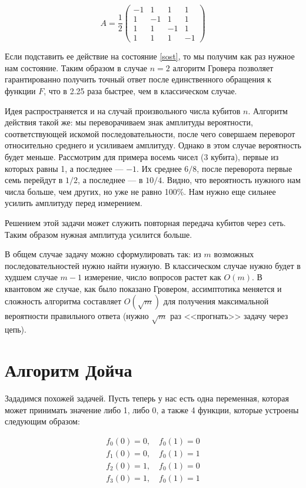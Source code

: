 \documentclass[a4paper, 12pt]{article}
\begin{document}
\begin{equation}
	A = \frac{1}{2}
	\begin{pmatrix}
		-1 & 1 & 1 & 1\\
		1 & -1 & 1 & 1\\
		1 & 1 & -1 & 1\\
		1 & 1 & 1 & -1
	\end{pmatrix}
\end{equation}

Если подставить ее действие на состояние \ref{sost}, то мы получим как раз нужное нам состояние. Таким образом в случае $n=2$ алгоритм Гровера позволяет гарантированно получить точный ответ после единственного обращения к функции $F$, что в 2.25 раза быстрее, чем в классическом случае.

Идея распространяется и на случай произвольного числа кубитов $n$. Алгоритм действия такой же: мы переворачиваем знак амплитуды вероятности, соответствующей искомой последовательности, после чего совершаем переворот относительно среднего и усиливаем амплитуду. Однако в этом случае вероятность будет меньше. Рассмотрим для примера восемь чисел (3 кубита), первые из которых равны 1, а последнее --- $-1$. Их среднее $6/8$, после переворота первые семь перейдут в $1/2$, а последнее --- в $10/4$. Видно, что вероятность нужного нам числа больше, чем других, но уже не равно 100\%. Нам нужно еще сильнее усилить амплитуду перед измерением.


Решением этой задачи может служить повторная передача кубитов через сеть. Таким образом нужная амплитуда усилится больше.

В общем случае задачу можно сформулировать так: из $m$ возможных последовательностей нужно найти нужную. В классическом случае нужно будет в худшем случае $m-1$ измерение, число вопросов растет как $O(m)$. В квантовом же случае, как было показано Гровером, ассимптотика меняется и сложность алгоритма составляет $O(\sqrt{m})$ для получения максимальной вероятности правильного ответа (нужно $\sqrt{m}$ раз <<прогнать>> задачу через цепь).

\section{Алгоритм Дойча}

Зададимся похожей задачей. Пусть теперь у нас есть одна переменная, которая может принимать значение либо 1, либо 0, а также 4 функции, которые устроены следующим образом:

\begin{align}
	f_0(0) = 0, \quad f_0(1) = 0\\
	f_1(0) = 0, \quad f_0(1) = 1\\
	f_2(0) = 1, \quad f_0(1) = 0\\
	f_3(0) = 1, \quad f_0(1) = 1
\end{align}
\end{document}
